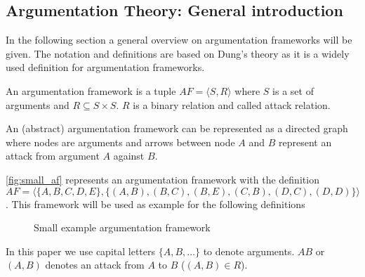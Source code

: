 \subsection{Argumentation Theory: General introduction}
In the following section a general overview on argumentation frameworks will be given. The notation and definitions are based on Dung's theory \cite{dung1995} as it is a widely used definition for argumentation frameworks.
\begin{definition}
	An argumentation framework is a tuple $AF = \langle S, R \rangle$ where $S$ is a set of arguments and $ R \subseteq S \times S$. $R$ is a binary relation and called attack relation.
\end{definition}


An (abstract) argumentation framework can be represented as a directed graph where nodes are arguments and arrows between node $A$ and $B$ represent an attack from argument $A$ against $B$.

\begin{exa}
 \autoref{fig:small_af} represents an argumentation framework with the definition $AF = \langle \{A, B, C, D, E\}, \{(A,B), (B, C), (B, E), (C, B), (D,C), (D,D)\}\rangle$. This framework will be used as example for the following definitions
	
\end{exa}


\begin{figure}[h]
\centering
{}
\caption{Small example argumentation framework}
\label{fig:small_af}
\end{figure}


\begin{notation}
In this paper we use capital letters $\{A, B, ...\}$ to denote arguments. $AB$ or $(A, B)$ denotes an attack from $A$ to $B$ ($(A,B) \in R$).	
\end{notation}


